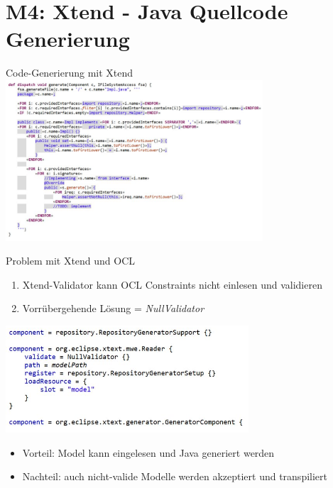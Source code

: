 \section[M4: Xtend]{M4: Xtend - Java Quellcode Generierung}
\begin{frame}{Code-Generierung mit Xtend}
	\centering
	\includegraphics[height=60mm]{figures/xtend.png}
\end{frame}

\begin{frame}{Problem mit Xtend und OCL}
	\begin{enumerate}
		\item Xtend-Validator kann OCL Constraints nicht einlesen und validieren
		\item Vorrübergehende Lösung = \textit{NullValidator}
	\end{enumerate}
	\centering
	\includegraphics[height=40mm]{figures/xtend-validator.png}
	\begin{itemize}
		\item Vorteil: Model kann eingelesen und Java generiert werden
		\item Nachteil: auch nicht-valide Modelle werden akzeptiert und transpiliert
	\end{itemize}
\end{frame}